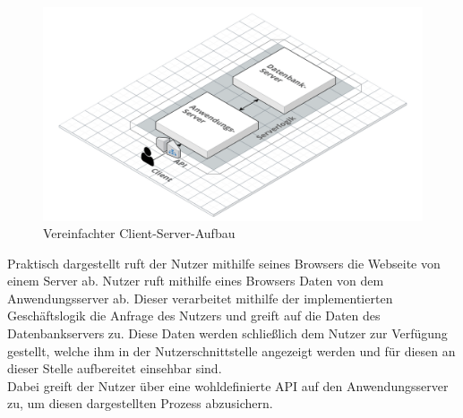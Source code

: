\begin{figure}[h]
    \centering
    \includegraphics[width=.9\textwidth]{img/ClientServer.png}
    \caption{Vereinfachter Client-Server-Aufbau}
    \label{fig:clientServerAufbau}
\end{figure}

Praktisch dargestellt ruft der Nutzer mithilfe seines Browsers die Webseite von einem Server ab.
Nutzer ruft mithilfe eines Browsers Daten von dem Anwendungsserver ab. Dieser verarbeitet mithilfe der implementierten Geschäftslogik die Anfrage des Nutzers und greift auf die Daten des Datenbankservers zu. Diese Daten werden schließlich dem Nutzer zur Verfügung gestellt, welche ihm in der Nutzerschnittstelle angezeigt werden und für diesen an dieser Stelle aufbereitet einsehbar sind.\\
Dabei greift der Nutzer über eine wohldefinierte \ac{API} auf den Anwendungsserver zu, um diesen dargestellten Prozess abzusichern.


